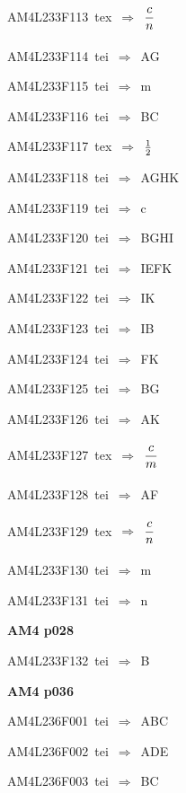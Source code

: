 {\sixrm AM4L233F113\ {\sixit tex}\ }$\Rightarrow$\ ${\displaystyle\strut c\over \displaystyle\strut n}$\par\smallskip
{\sixrm AM4L233F114\ {\sixit tei}\ }$\Rightarrow$\ AG\par\smallskip
{\sixrm AM4L233F115\ {\sixit tei}\ }$\Rightarrow$\ {\tenit m}\par\smallskip
{\sixrm AM4L233F116\ {\sixit tei}\ }$\Rightarrow$\ BC\par\smallskip
{\sixrm AM4L233F117\ {\sixit tex}\ }$\Rightarrow$\ ${1\over 2}$\par\smallskip
{\sixrm AM4L233F118\ {\sixit tei}\ }$\Rightarrow$\ AGHK\par\smallskip
{\sixrm AM4L233F119\ {\sixit tei}\ }$\Rightarrow$\ {\tenit c}\par\smallskip
{\sixrm AM4L233F120\ {\sixit tei}\ }$\Rightarrow$\ BGHI\par\smallskip
{\sixrm AM4L233F121\ {\sixit tei}\ }$\Rightarrow$\ IEFK\par\smallskip
{\sixrm AM4L233F122\ {\sixit tei}\ }$\Rightarrow$\ IK\par\smallskip
{\sixrm AM4L233F123\ {\sixit tei}\ }$\Rightarrow$\ IB\par\smallskip
{\sixrm AM4L233F124\ {\sixit tei}\ }$\Rightarrow$\ FK\par\smallskip
{\sixrm AM4L233F125\ {\sixit tei}\ }$\Rightarrow$\ BG\par\smallskip
{\sixrm AM4L233F126\ {\sixit tei}\ }$\Rightarrow$\ AK\par\smallskip
{\sixrm AM4L233F127\ {\sixit tex}\ }$\Rightarrow$\ ${\displaystyle\strut c\over \displaystyle\strut m}$\par\smallskip
{\sixrm AM4L233F128\ {\sixit tei}\ }$\Rightarrow$\ AF\par\smallskip
{\sixrm AM4L233F129\ {\sixit tex}\ }$\Rightarrow$\ ${\displaystyle\strut c\over \displaystyle\strut n}$\par\smallskip
{\sixrm AM4L233F130\ {\sixit tei}\ }$\Rightarrow$\ {\tenit m}\par\smallskip
{\sixrm AM4L233F131\ {\sixit tei}\ }$\Rightarrow$\ {\tenit n}\par\smallskip

\par\vfill\eject
{\bf\hfill AM4 p028\hfill\hbox{}}\par\bigskip
{\sixrm AM4L233F132\ {\sixit tei}\ }$\Rightarrow$\ B\par\smallskip

\par\vfill\eject
{\bf\hfill AM4 p036\hfill\hbox{}}\par\bigskip
{\sixrm AM4L236F001\ {\sixit tei}\ }$\Rightarrow$\ ABC\par\smallskip
{\sixrm AM4L236F002\ {\sixit tei}\ }$\Rightarrow$\ ADE\par\smallskip
{\sixrm AM4L236F003\ {\sixit tei}\ }$\Rightarrow$\ BC\par\smallskip

